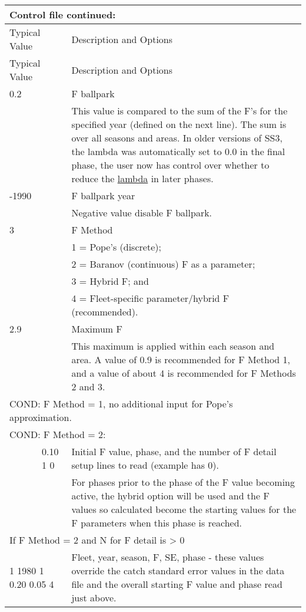 \begin{longtable}{p{1cm} p{3cm} p{11cm}}
	\multicolumn{3}{l}{Control file continued:} \\
	\hline
	\multicolumn{2}{l}{Typical Value} & Description and Options \Tstrut\Bstrut\\
	\hline
	\endfirsthead

	\hline
	\multicolumn{2}{l}{Typical Value} & Description and Options \Tstrut\Bstrut\\
	\hline
	\endhead

	\hline
	\endfoot
	\endlastfoot

	0.2 \Tstrut & & F ballpark \\
		& & This value is compared to the sum of the F's for the specified year (defined on the next line). The sum is over all seasons and areas. In older versions of SS3, the lambda was automatically set to 0.0 in the final phase, the user now has control over whether to reduce the \hyperlink{Lambdas}{lambda} in later phases. \Bstrut\\
	\hline

	-1990\Tstrut & & F ballpark year \\
		& & Negative value disable F ballpark. \Bstrut\\
	\hline

	3 \Tstrut & & F Method \\
	   & & 1 = Pope's (discrete); \\
	   & & 2 = Baranov (continuous) F as a parameter; \\
	   & & 3 = Hybrid F; and \\
	   & & 4 = Fleet-specific parameter/hybrid F (recommended). \Bstrut\\
	\hline

	2.9 \Tstrut & & Maximum F \\
	 & & This maximum is applied within each season and area. A value of 0.9 is recommended for F Method 1, and a value of about 4 is recommended for F Methods 2 and 3. \Bstrut\\
	\hline

	\multicolumn{3}{l}{COND: F Method = 1, no additional input for Pope's approximation.} \Tstrut\Bstrut\\
	\hline

	\multicolumn{3}{l}{COND: F Method = 2:} \Tstrut\\
	& 0.10 1 0 & Initial F value, phase, and the number of F detail setup lines to read (example has 0). \\
	&  & For phases prior to the phase of the F value becoming active, the hybrid option will be used and the F values so calculated become the starting values for the F parameters when this phase is reached. \\
	\multicolumn{3}{l}{If F Method = 2 and N for F detail is > 0} \Tstrut\\
	\multicolumn{2}{l}{1 1980 1 0.20 0.05 4} & Fleet, year, season, F, SE, phase - these values override the catch standard error values in the data file and the overall starting F value and phase read just above. \Bstrut\\
	\hline


\end{longtable}
